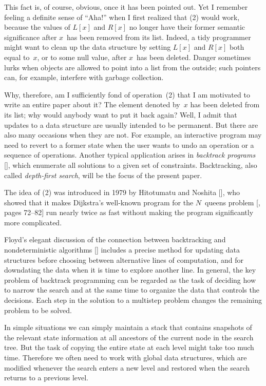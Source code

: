 This fact is, of course, obvious, once it has been pointed out.  Yet I
remember feeling a definite sense of ``Aha!'' when I first realized
that (2) would work, because the values of $L[x]$ and $R[x]$ no longer
have their former semantic significance after $x$~has been removed
from its list.  Indeed, a tidy programmer might want to clean up the
data structure by setting $L[x]$ and $R[x]$ both equal to~$x$, or to
some null value, after $x$~has been deleted.  Danger sometimes lurks
when objects are allowed to point into a list from the outside; such
pointers can, for example, interfere with garbage collection.

Why, therefore, am I sufficiently fond of operation~(2) that I am
motivated to write an entire paper about it?  The element denoted
by~$x$ has been deleted from its list; why would anybody want to put
it back again?  Well, I admit that updates to a data structure are
usually intended to be permanent.  But there are also many occasions
when they are not.  For example, an interactive program may need to
revert to a former state when the user wants to undo an operation or a
sequence of operations.  Another typical application arises in {\it
backtrack programs\/} [\GB], which enumerate all solutions to a given
set of constraints.  Backtracking, also called {\it depth-first
search}, will be the focus of the present paper.

The idea of (2) was introduced in 1979 by Hitotumatu and Noshita
[\HN], who showed that it makes Dijkstra's well-known program for the
$N$~queens problem [\DDH, pages 72--82] run nearly twice as fast
without making the program significantly more complicated.

Floyd's elegant discussion of the connection between backtracking and
nondeterministic algorithms [\Flo] includes a precise method for
updating data structures before choosing between alternative lines of
computation, and for downdating the data when it is time to explore
another line.  In general, the key problem of backtrack programming
can be regarded as the task of deciding how to narrow the search and
at the same time to organize the data that controls the decisions.
Each step in the solution to a multistep problem changes the remaining
problem to be solved.

In simple situations we can simply maintain a stack that contains
snapshots of the relevant state information at all ancestors of the
current node in the search tree.  But the task of copying the entire
state at each level might take too much time.  Therefore we
often need to work with global data structures, which are modified
whenever the search enters a new level and restored when the search
returns to a previous level.

